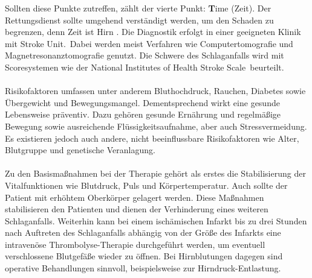 Sollten diese Punkte zutreffen, zählt der vierte Punkt: \textbf{T}ime (Zeit). Der Rettungsdienst sollte umgehend verständigt werden, um den Schaden zu begrenzen, denn \glqq Zeit ist Hirn \grqq.\cite{Src:ApoFlex}
Die Diagnostik erfolgt in einer geeigneten Klinik mit \glqq Stroke Unit\grqq .~Dabei werden meist Verfahren wie Computertomografie und Magnetresonanztomografie genutzt. Die Schwere des Schlaganfalls wird mit Scoresystemen wie der \glqq National Institutes of Health Stroke Scale\grqq ~beurteilt.
\\ \\
Risikofaktoren umfassen unter anderem Bluthochdruck, Rauchen, Diabetes sowie Übergewicht und Bewegungsmangel. Dementsprechend wirkt eine gesunde Lebensweise präventiv. Dazu gehören gesunde Ernährung und regelmäßige Bewegung sowie ausreichende Flüssigkeitsaufnahme, aber auch Stressvermeidung.\cite{Src:ApoFlex} Es existieren jedoch auch andere, nicht beeinflussbare Risikofaktoren wie Alter, Blutgruppe und genetische Veranlagung.
\\ \\
Zu den Basismaßnahmen bei der Therapie gehört als erstes die Stabilisierung der Vitalfunktionen wie Blutdruck, Puls und Körpertemperatur. Auch sollte der Patient mit erhöhtem Oberkörper gelagert werden. Diese Maßnahmen stabilisieren den Patienten und dienen der Verhinderung eines weiteren Schlaganfalls. Weiterhin kann bei einem ischämischen Infarkt bis zu drei Stunden nach Auftreten des Schlaganfalls abhängig von der Größe des Infarkts eine intravenöse Thrombolyse-Therapie durchgeführt werden, um eventuell verschlossene Blutgefäße wieder zu öffnen. Bei Hirnblutungen dagegen sind operative Behandlungen sinnvoll, beispielsweise zur Hirndruck-Entlastung.\cite{Src:ApoFlex}
